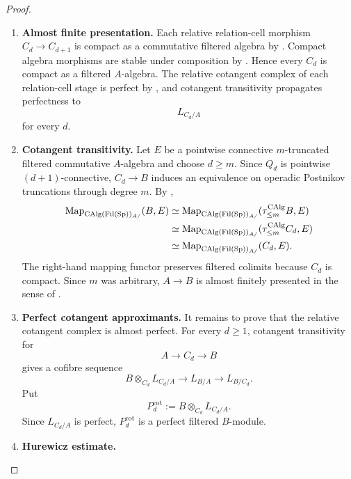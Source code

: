 \begin{proof}
\begin{enumerate}[label=\textup{(\arabic*)}]
    \[
        C_{d+1}\longrightarrow B\longrightarrow Q_{d+1}
    \]
    then makes \(Q_{d+1}\) almost perfect over \(A\).
    \item \textbf{Almost finite presentation.}
    Each relative relation-cell morphism \(C_d\to C_{d+1}\) is compact as a
    commutative filtered algebra by
    . Compact algebra morphisms are
    stable under composition by
    . Hence every \(C_d\) is
    compact as a filtered \(A\)-algebra. The relative cotangent complex of each
    relation-cell stage is perfect by
    , and cotangent transitivity
    propagates perfectness to
    \[
        L_{C_d/A}
    \]
    for every \(d\).
    \item \textbf{Cotangent transitivity.}
    Let \(E\) be a pointwise connective \(m\)-truncated filtered commutative
    \(A\)-algebra and choose \(d\geq m\). Since \(Q_d\) is pointwise
    \((d+1)\)-connective, \(C_d\to B\) induces an equivalence on operadic
    Postnikov truncations through degree \(m\). By
    ,
    \[
    \begin{aligned}
        \operatorname{Map}_{\operatorname{CAlg}(\operatorname{Fil}(\operatorname{Sp}))_{A/}}(B,E)
        &\simeq
        \operatorname{Map}_{\operatorname{CAlg}(\operatorname{Fil}(\operatorname{Sp}))_{A/}}(\tau_{\leq m}^{\operatorname{CAlg}}B,E)\\
        &\simeq
        \operatorname{Map}_{\operatorname{CAlg}(\operatorname{Fil}(\operatorname{Sp}))_{A/}}(\tau_{\leq m}^{\operatorname{CAlg}}C_d,E)\\
        &\simeq
        \operatorname{Map}_{\operatorname{CAlg}(\operatorname{Fil}(\operatorname{Sp}))_{A/}}(C_d,E).
    \end{aligned}
    \]
    The right-hand mapping functor preserves filtered colimits because \(C_d\) is
    compact. Since \(m\) was arbitrary, \(A\to B\) is almost finitely presented
    in the sense of
    .
    \item \textbf{Perfect cotangent approximants.}
    It remains to prove that the relative cotangent complex is almost perfect.
    For every \(d\geq1\), cotangent transitivity for
    \[
        A\longrightarrow C_d\longrightarrow B
    \]
    gives a cofibre sequence
    \[
        B\otimes_{C_d}L_{C_d/A}
        \longrightarrow
        L_{B/A}
        \longrightarrow
        L_{B/C_d}.
    \]
    Put
    \[
        P_d^{\mathrm{cot}}
        :=
        B\otimes_{C_d}L_{C_d/A}.
    \]
    Since \(L_{C_d/A}\) is perfect, \(P_d^{\mathrm{cot}}\) is a perfect
    filtered \(B\)-module.
    \item \textbf{Hurewicz estimate.}

\end{enumerate}
\end{proof}
